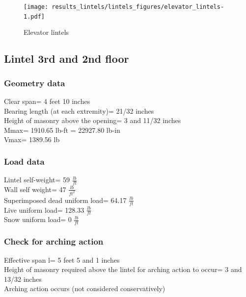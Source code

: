 \begin{figure}
  \begin{center}
  \texttt{[image: results\_lintels/lintels\_figures/elevator\_lintels-1.pdf]}
  \end{center}
  \caption{Elevator lintels}\label{elevator_lintels.pdf}
\end{figure}

\subsection{Lintel 3rd and 2nd floor}
\subsubsection{Geometry data}
Clear span=  4 feet 10 inches \\
Bearing length (at each extremity)=  21/32 inches \\
Height of masonry above the opening=  3 and 11/32 inches \\
Mmax=  1910.65 lb-ft = 22927.80  lb-in \\
Vmax=  1389.56 lb \\
\subsubsection{Load data}
Lintel self-weight=  59  $\frac{lb}{ft}$ \\
Wall self weight=  47 $\frac{lb}{ft^2}$ \\
Superimposed dead uniform load=  64.17 $\frac{lb}{ft}$ \\
Live uniform load=  128.33 $\frac{lb}{ft}$ \\
Snow uniform load=  0 $\frac{lb}{ft}$ \\
\vspace{0.25 cm}
\subsubsection{Check for arching action}
Effective span l=  5 feet 5 and 1 inches \\
Height of masonry required above the lintel for arching action to occur=  3 and 13/32 inches \\
Arching action occurs (not considered conservatively) \\
